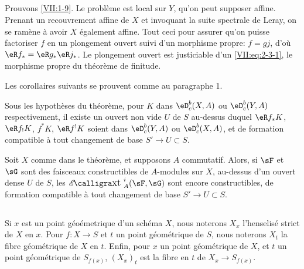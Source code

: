 \subsection{}\label{VII:2-8}

Prouvons \ref{VII:1-9}. Le probl\`eme est local sur $Y$, qu'on peut supposer 
affine. Prenant un recouvrement affine de $X$ et invoquant la suite spectrale 
de Leray, on se ram\`ene \`a avoir $X$ \'egalement affine. Tout ceci pour 
assurer qu'on puisse factoriser $f$ en un plongement ouvert suivi d'un 
morphisme propre: $f=g j$, d'o\`u $\eR f_\ast = \eR g_\ast \eR j_\ast$. Le 
plongement ouvert est justiciable d'un \eqref{VII:eq:2-3-1}, le morphisme 
propre du th\'eor\`eme de finitude. 

Les corollaires suivants se prouvent comme au paragraphe 1. 





\begin{corollary_}\label{VII:2-9}
Sous les hypoth\`eses du th\'eor\`eme, pour $K$ dans $\eD_c^b(X,A)$ ou 
$\eD_c^b(Y,A)$ respectivement, il existe un ouvert non vide $U$ de $S$ 
au-dessus duquel $\eR f_\ast K$, $\eR f_! K$, $f^\ast K$, $\eR f^! K$ soient 
dans $\eD_c^b(Y,A)$ ou $\eD_c^b(X,A)$, et de formation compatible \`a tout 
changement de base $S' \to U\subset S$. 
\end{corollary_}





\begin{corollary_}\label{VII:2-10}
Soit $X$ comme dans le th\'eor\`eme, et supposons $A$ commutatif. Alors, si 
$\sF$ et $\sG$ sont des faisceaux constructibles de $A$-modules sur $X$, 
au-dessus d'un ouvert dense $U$ de $S$, les $\Ext_A^i(\sF,\sG)$ sont encore 
constructibles, de formation compatible \`a tout changement de base 
$S' \to U\subset S$. 
\end{corollary_}





\subsection{}\label{VII:2-11}

Si $x$ est un point g\'eo\'emetrique d'un sch\'ema $X$, nous noterons $X_x$ 
l'henselis\'e strict de $X$ en $x$. Pour $f:X\to S$ et $t$ un point 
g\'eom\'etrique de $S$, nous noterons $X_t$ la fibre g\'eom\'etrique de $X$ en 
$t$. Enfin, pour $x$ un point g\'eom\'etrique de $X$, et $t$ un point 
g\'eom\'etrique de $S_{f(x)}$, $(X_x)_t$ est la fibre en $t$ de 
$X_x \to S_{f(x)}$. 





